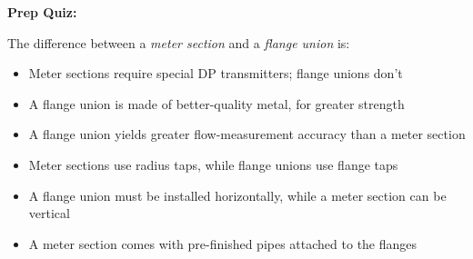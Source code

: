 \vfil \eject

\noindent
{\bf Prep Quiz:}

The difference between a {\it meter section} and a {\it flange union} is:

\begin{itemize}
\item{} Meter sections require special DP transmitters; flange unions don't
\vskip 5pt 
\item{} A flange union is made of better-quality metal, for greater strength
\vskip 5pt 
\item{} A flange union yields greater flow-measurement accuracy than a meter section
\vskip 5pt 
\item{} Meter sections use radius taps, while flange unions use flange taps
\vskip 5pt 
\item{} A flange union must be installed horizontally, while a meter section can be vertical
\vskip 5pt 
\item{} A meter section comes with pre-finished pipes attached to the flanges
\end{itemize}




